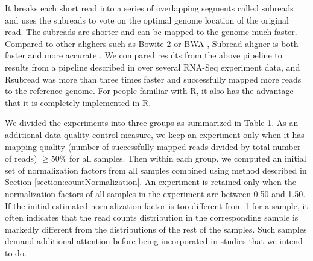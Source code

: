 \documentclass[letterpaper,12pt]{article}
\begin{document}
It breaks each short read into a series of overlapping segments called
subreads and uses the subreads to vote on the optimal genome location of the
original read. The subreads are shorter and can be mapped to the genome much
faster.
Compared to other alighers such as Bowite 2 \citep{langmead2012fast} or BWA
\citep{li2009fast}, Subread aligner is both faster and more accurate
\citep{liao2013subread}. We compared results from the above
pipeline to results from a pipeline described in \cite{anders2013count} over several RNA-Seq experiment data, and Rsubread
was more than three times faster and successfully mapped more reads to the
reference genome.  For people familiar with R, it also has the advantage
that it is completely implemented in R.



We divided the experiments into three groups as summarized in Table 1.  As an
additional data quality control measure,  we keep an experiment only when it has mapping quality (number of successfully mapped reads divided by total number of reads) $\geq 50\%$ for all samples.
Then within each group, we computed an
initial set of normalization factors from all samples combined using method
described in Section \ref{section:countNormalization}.  An experiment is
retained only when the normalization factors of all samples in the experiment
are between 0.50 and 1.50.  If the initial estimated normalization factor is
too different from 1 for a sample, it often indicates that the read counts
distribution in the corresponding sample is markedly different from the
distributions of the rest of the samples. Such samples demand additional
attention before being incorporated in studies that we intend to do.


\end{document}
